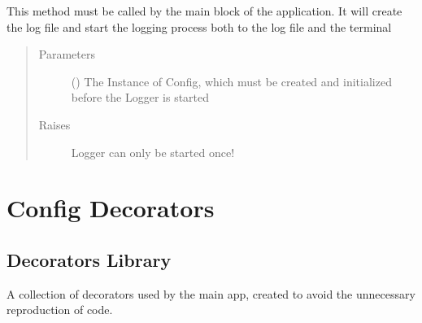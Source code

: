 \documentclass[letterpaper,10pt,english]{sphinxmanual}
\begin{document}
\begin{fulllineitems}
\begin{fulllineitems}
This method must be called by the main block of the application.
It will create the log file and start the logging process both to
the log file and the terminal
\begin{quote}\begin{description}
\item[{Parameters}] \leavevmode
{} () \textendash{} The Instance of Config, which must be created and initialized before the Logger is started

\item[{Raises}] \leavevmode
{} \textendash{} Logger can only be started once!

\end{description}\end{quote}

\end{fulllineitems}


\end{fulllineitems}



\chapter{Config Decorators}
\label{\detokenize{index:module-config.decorators}}\label{\detokenize{index:config-decorators}}

\section{Decorators Library}
\label{\detokenize{index:decorators-library}}
A collection of decorators used by the main
app, created to avoid the unnecessary
reproduction of code.
\end{document}
